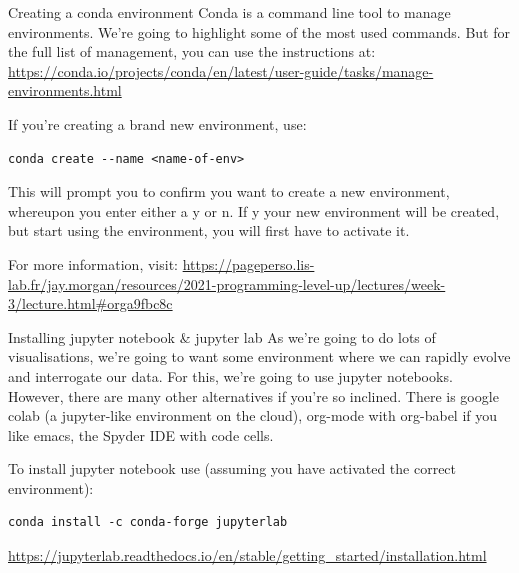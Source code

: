 \documentclass[10pt]{beamer}
\begin{document}
\begin{frame}[label={sec:orgcbefc53},fragile]{Creating a conda environment}
 Conda is a command line tool to manage environments. We're going to highlight some of the most used commands. But for the full list of management, you can use the instructions at: \url{https://conda.io/projects/conda/en/latest/user-guide/tasks/manage-environments.html}

If you're creating a brand new environment, use:

\begin{verbatim}
conda create --name <name-of-env>
\end{verbatim}

This will prompt you to confirm you want to create a new environment, whereupon you
enter either a y or n. If y your new environment will be created, but start using the
environment, you will first have to activate it.

For more information, visit:
\url{https://pageperso.lis-lab.fr/jay.morgan/resources/2021-programming-level-up/lectures/week-3/lecture.html\#orga9fbc8c}
\end{frame}


\begin{frame}[label={sec:org51358a0},fragile]{Installing jupyter notebook \& jupyter lab}
 As we're going to do lots of visualisations, we're going to want some environment
where we can rapidly evolve and interrogate our data. For this, we're going to use
jupyter notebooks. However, there are many other alternatives if you're so
inclined. There is google colab (a jupyter-like environment on the cloud), org-mode
with org-babel if you like emacs, the Spyder IDE with code cells.

To install jupyter notebook use (assuming you have activated the correct environment):

\begin{verbatim}
conda install -c conda-forge jupyterlab
\end{verbatim}

\url{https://jupyterlab.readthedocs.io/en/stable/getting\_started/installation.html}
\end{frame}
\end{document}
